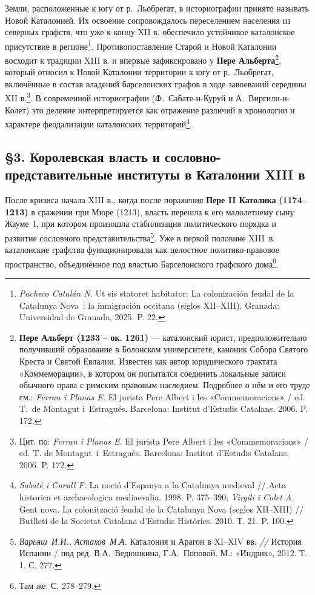 Земли, расположенные к югу от р.~Льобрегат, в историографии принято называть Новой Каталонией. Их освоение сопровождалось переселением населения из северных графств, что уже к концу XII в. обеспечило устойчивое каталонское присутствие в регионе\footnote{\emph{Pacheco Catalán N.} Ut sis statoret habitator: La colonización feudal de la Catalunya Nova~: la inmigración occitana (siglos XII--XIII). Granada: Universidad de Granada, 2025. P. 22.}. Противопоставление Старой и Новой Каталонии восходит к традиции XIII в. и впервые зафиксировано у \textbf{Пере Альберта}\footnote{\textbf{Пере Альберт (1233}\textbf{ -- }\textbf{ок}\textbf{. }\textbf{1261)} --- каталонский юрист, предположительно получивший образование в Болонском университете, каноник Собора Святого Креста и Святой Евлалии. Известен как автор юридического трактата «Коммеморации», в котором он попытался соединить локальные записи обычного права с римским правовым наследием. Подробнее о нём и его труде см.: \emph{Ferran i Planas E.} El jurista Pere Albert i les «Commemoracions» / ed. T.~de Montagut i~Estragués. Barcelona: Institut d’Estudis Catalans. 2006. P. 172.}, который относил к Новой Каталонии территории к югу от р.~Льобрегат, включённые в состав владений барселонских графов в ходе завоеваний середины XII в.\footnote{Цит. по: \emph{Ferran i Planas E.} El jurista Pere Albert i les «Commemoracions» / ed. T. de Montagut~i~Estragués. Barcelona: Institut d’Estudis Catalans, 2006. P. 172.}. В современной историографии (Ф.~Сабате-и-Куруй и А.~Виргили-и-Колет) это деление интерпретируется как отражение различий в хронологии и характере феодализации каталонских территорий\footnote{\emph{Sabaté i Curull F.} La noció d’Espanya a la Catalunya medieval // Acta historica et archaeologica mediaevalia. 1998. P. 375--390; \emph{Virgili i Colet A.} Gent nova. La colonització feudal de la Catalunya Nova (segles XII--XIII) // Butlletí de la Societat Catalana d’Estudis Històrics. 2010. Т. 21. P. 100.}.

\subsection*{§3. Королевская власть и сословно-представительные институты в Каталонии XIII в}

После кризиса начала XIII в., когда после поражения \textbf{Пере II Католика }\textbf{(1174--1213)} в сражении при Мюре (1213), власть перешла к его малолетнему сыну Жауме~I, при котором произошла стабилизация политического порядка и развитие сословного представительства\footnote{\emph{Варьяш}\emph{~И.И., Астахов~М.А.} Каталония и Арагон в XI--XIV вв. \emph{// }История Испании / под ред. В.А.~Ведюшкина, Г.А.~Поповой. М.: «Индрик», 2012. Т. 1. С. 277.}. Уже в первой половине XIII~в. каталонские графства функционировали как целостное политико-правовое пространство, объединённое под властью Барселонского графского дома\footnote{Там же. С. 278--279.}.

